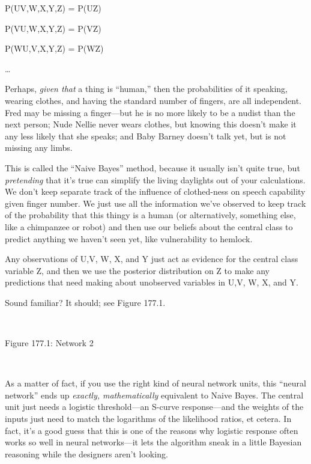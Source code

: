 {\centering
 P(U{\textbar}V,W,X,Y,Z) = P(U{\textbar}Z)
\par}


\bigskip

{\centering
 P(V{\textbar}U,W,X,Y,Z) = P(V{\textbar}Z)
\par}


\bigskip

{\centering
 P(W{\textbar}U,V,X,Y,Z) = P(W{\textbar}Z)
\par}


\bigskip

{\centering
 {\dots}
\par}


\bigskip

{
 Perhaps, \textit{given that} a thing is
``human,'' then the probabilities of
it speaking, wearing clothes, and having the standard number of
fingers, are all independent. Fred may be missing a finger---but he is
no more likely to be a nudist than the next person; Nude Nellie never
wears clothes, but knowing this doesn't make it any
less likely that she speaks; and Baby Barney doesn't
talk yet, but is not missing any limbs.}

{
 This is called the ``Naive
Bayes'' method, because it usually
isn't quite true, but \textit{pretending} that
it's true can simplify the living daylights out of your
calculations. We don't keep separate track of the
influence of clothed-ness on speech capability given finger number. We
just use all the information we've observed to keep
track of the probability that this thingy is a human (or alternatively,
something else, like a chimpanzee or robot) and then use our beliefs
about the central class to predict anything we haven't
seen yet, like vulnerability to hemlock.}

{
 Any observations of U,V, W, X, and Y just act as evidence for the
central class variable Z, and then we use the posterior distribution on
Z to make any predictions that need making about unobserved variables
in U,V, W, X, and Y.}

{
 Sound familiar? It should; see Figure 177.1.}

{
 ~}

{\centering
{}
 \newline
 Figure 177.1: Network 2
\par}


\bigskip

{
 ~}

{
 As a matter of fact, if you use the right kind of neural network
units, this ``neural network'' ends
up \textit{exactly, mathematically} equivalent to Naive Bayes. The
central unit just needs a logistic threshold---an S-curve
response---and the weights of the inputs just need to match the
logarithms of the likelihood ratios, et cetera. In fact,
it's a good guess that this is one of the reasons why
logistic response often works so well in neural networks---it lets the
algorithm sneak in a little Bayesian reasoning while the designers
aren't looking.}

